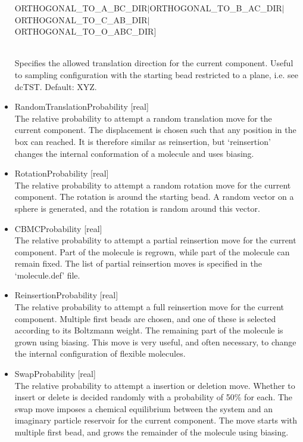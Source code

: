 \begin{itemize}
{\begin{small}
      \hspace*{2cm}ORTHOGONAL\_TO\_A\_BC\_DIR$|$ORTHOGONAL\_TO\_B\_AC\_DIR$|$ORTHOGONAL\_TO\_C\_AB\_DIR$|$\\
      \hspace*{2cm}ORTHOGONAL\_TO\_O\_ABC\_DIR]
     \end{small}}\\
Specifies the allowed translation direction for the current component. Useful to sampling configuration with the starting bead restricted to a plane, i.e. see dcTST.
Default: XYZ.
\item{RandomTranslationProbability [real]}\\
The relative probability to attempt a random translation move for the current component. The displacement is chosen such that any position in the box can reached. It is therefore
similar as reinsertion, but `reinsertion' changes the internal conformation of a molecule and uses biasing.
\item{RotationProbability [real]}\\ 
The relative probability to attempt a random rotation move for the current component. The rotation is around the starting bead. A random vector on a sphere
is generated, and the rotation is random around this vector.
\item{CBMCProbability [real]}\\
The relative probability to attempt a partial reinsertion move for the current component. Part of the molecule is regrown, while part of the molecule can remain fixed.
The list of partial reinsertion moves is specified in the `molecule.def' file.
\item{ReinsertionProbability [real]}\\
The relative probability to attempt a full reinsertion move for the current component. Multiple first beads are chosen, and one of these is selected according to its Boltzmann weight.
The remaining part of the molecule is grown using biasing. This move is very useful, and often necessary, to change the internal configuration of flexible molecules.
\item{SwapProbability [real]}\\
The relative probability to attempt a insertion or deletion move. Whether to insert or delete is decided randomly with a probability of 50\% for each.
The swap move imposes a chemical equilibrium between the system and an imaginary particle reservoir for the current component. The move starts with multiple first bead, and
grows the remainder of the molecule using biasing.

\end{itemize}
